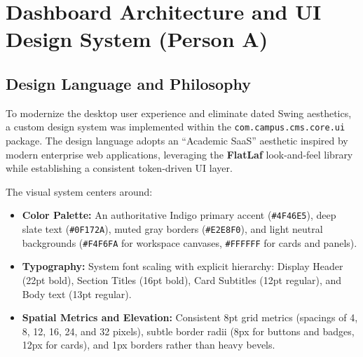 \section{Dashboard Architecture and UI Design System (Person A)}
\label{sec:ui-design-system}

\subsection{Design Language and Philosophy}
To modernize the desktop user experience and eliminate dated Swing aesthetics, a custom design system was implemented within the \texttt{com.campus.cms.core.ui} package. The design language adopts an ``Academic SaaS'' aesthetic inspired by modern enterprise web applications, leveraging the \textbf{FlatLaf} look-and-feel library while establishing a consistent token-driven UI layer.

The visual system centers around:
\begin{itemize}
    \item \textbf{Color Palette:} An authoritative Indigo primary accent (\texttt{\#4F46E5}), deep slate text (\texttt{\#0F172A}), muted gray borders (\texttt{\#E2E8F0}), and light neutral backgrounds (\texttt{\#F4F6FA} for workspace canvases, \texttt{\#FFFFFF} for cards and panels).
    \item \textbf{Typography:} System font scaling with explicit hierarchy: Display Header (22pt bold), Section Titles (16pt bold), Card Subtitles (12pt regular), and Body text (13pt regular).
    \item \textbf{Spatial Metrics and Elevation:} Consistent 8pt grid metrics (spacings of 4, 8, 12, 16, 24, and 32 pixels), subtle border radii (8px for buttons and badges, 12px for cards), and 1px borders rather than heavy bevels.
\end{itemize}

